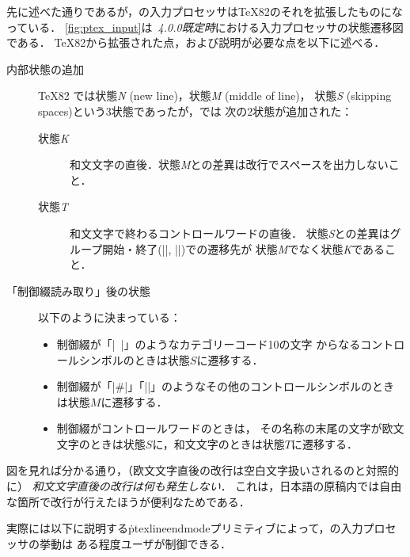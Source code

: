 \documentclass[a4paper,11pt,nomag,dvipdfmx]{jsarticle}
\begin{document}
先に述べた通りであるが，\pTeX の入力プロセッサは\TeX82のそれを拡張したものになっている．
\autoref{fig:ptex_input}は\emph{\pTeX~4.0.0既定時}における入力プロセッサの状態遷移図である．
\TeX82から拡張された点，および説明が必要な点を以下に述べる．
\begin{description}
  \item[内部状態の追加] \TeX82 では状態\textit{N} (new line)，状態\textit{M} (middle of line)，
  状態\textit{S} (skipping spaces)という3状態であったが，\pTeX では
  次の2状態が追加された：
  \begin{description}
    \item[状態\textit{K}] 和文文字の直後．状態\textit{M}との差異は改行でスペースを出力しないこと．
    \item[状態\textit{T}] 和文文字で終わるコントロールワードの直後．
    状態\textit{S}との差異はグループ開始・終了(|{|, |}|)での遷移先が
    状態\textit{M}でなく状態\textit{K}であること．
  \end{description}
  \item[「制御綴読み取り」後の状態] 以下のように決まっている：
  \begin{itemize}
    \item 制御綴が「|\ |」のようなカテゴリーコード10の文字
    からなるコントロールシンボルのときは状態$S$に遷移する．
    \item 制御綴が「|\#|」「|\】|」のようなその他のコントロールシンボルのときは状態$M$に遷移する．
    \item 制御綴がコントロールワードのときは，
    その名称の末尾の文字が欧文文字のときは状態$S$に，和文文字のときは状態$T$に遷移する．
  \end{itemize}
\end{description}

図を見れば分かる通り，（欧文文字直後の改行は空白文字扱いされるのと対照的に）
\emph{和文文字直後の改行は何も発生しない}．
これは，日本語の原稿内では自由な箇所で改行が行えたほうが便利なためである．

実際には以下に説明する\.{ptexlineendmode}プリミティブによって，\pTeX の入力プロセッサの挙動は
ある程度ユーザが制御できる．
\end{document}

